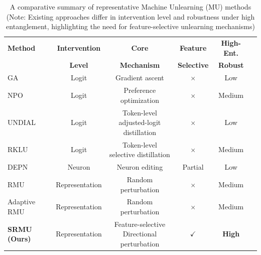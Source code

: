 \begin{table}[ht]
\centering
\caption{A comparative summary of representative Machine Unlearning (MU) methods (Note: Existing approaches differ in intervention level and robustness under high entanglement, highlighting the need for feature-selective unlearning mechanisms)}

\label{tab:mu_comparison}

\begin{tabular}{lccccc}
\toprule
\textbf{Method} 
& \textbf{Intervention} 
& \textbf{Core} 
& \textbf{Feature} 
& \textbf{High-Ent.} \\
& \textbf{Level} 
&  \textbf{Mechanism}
& \textbf{Selective} 
& \textbf{Robust} \\
\midrule
GA \cite{yao2024machine} 
& Logit 
& Gradient ascent 
& \textbf{$\times$ }
& Low \\
NPO \cite{zhang2024negative} 
& Logit 
& Preference optimization 
& \textbf{$\times$ }
& Medium \\
UNDIAL \cite{dong2025undial} 
& Logit 
&\makecell[c]{Token-level \\adjusted-logit distillation}
& \textbf{$\times$ }
& Low \\
RKLU \cite{wang2025balancing} 
& Logit 
&\makecell[c]{Token-level \\selective distillation}
& \textbf{$\times$ }
& Medium \\
DEPN \cite{wu-etal-2023-depn}
& Neuron 
& Neuron editing 
& Partial 
& Low \\
\midrule
RMU \cite{pmlr-v235-li24bc} 
& Representation 
& Random perturbation 
& \textbf{$\times$ }
& Medium \\
Adaptive RMU \cite{10.1609/aaai.v39i22.34544} 
& Representation 
& Random perturbation 
& \textbf{$\times$ }
& Medium \\
\textbf{SRMU (Ours)} 
& Representation 
&\makecell[c]{Feature-selective\\Directional perturbation}
& \textbf{$\checkmark$}
& \textbf{High} \\
\bottomrule
\end{tabular}
\end{table}



